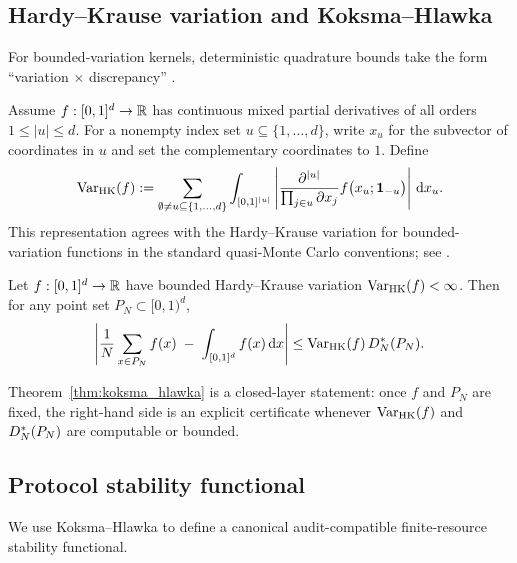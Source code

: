 \subsection{Hardy--Krause variation and Koksma--Hlawka}
\label{sec:koksma_hlawka}

For bounded-variation kernels, deterministic quadrature bounds take the form ``variation $\times$ discrepancy'' \cite{Koksma1935,Hlawka1961,KuipersNiederreiter1974,Niederreiter1992,DickPillichshammer2010}.

\begin{definition}
\label{def:hkvar_smooth}
Assume $f:[0,1]^d\to\mathbb{R}$ has continuous mixed partial derivatives of all orders $1\le |u|\le d$.
For a nonempty index set $u\subseteq\{1,\dots,d\}$, write $x_u$ for the subvector of coordinates in $u$ and set the complementary coordinates to $1$.
Define
\[
\mathrm{Var}_{\mathrm{HK}}(f)
:=
\sum_{\emptyset\neq u\subseteq\{1,\dots,d\}}
\int_{[0,1]^{|u|}}
\left|
\frac{\partial^{|u|}}{\prod_{j\in u}\partial x_j}
f\big(x_u;\mathbf{1}_{-u}\big)
\right|\,
\mathrm{d} x_u.
\]
This representation agrees with the Hardy--Krause variation for bounded-variation functions in the standard quasi-Monte Carlo conventions; see \cite[\S 3.3]{DickPillichshammer2010}.
\end{definition}

\begin{theorem}
\label{thm:koksma_hlawka}
Let $f:[0,1]^d\to\mathbb{R}$ have bounded Hardy--Krause variation $\mathrm{Var}_{\mathrm{HK}}(f)<\infty$.
Then for any point set $P_N\subset[0,1)^d$,
\[
\left|\frac{1}{N}\sum_{x\in P_N} f(x)\;-\;\int_{[0,1]^d} f(x)\,\mathrm{d} x\right|
\le \mathrm{Var}_{\mathrm{HK}}(f)\,D_N^\ast(P_N).
\]
\end{theorem}

\begin{remark}
Theorem~\ref{thm:koksma_hlawka} is a closed-layer statement: once $f$ and $P_N$ are fixed, the right-hand side is an explicit certificate whenever $\mathrm{Var}_{\mathrm{HK}}(f)$ and $D_N^\ast(P_N)$ are computable or bounded.
\end{remark}

\subsection{Protocol stability functional}
\label{sec:stability_functional}

We use Koksma--Hlawka to define a canonical audit-compatible finite-resource stability functional.


